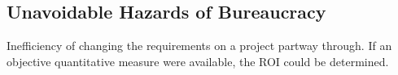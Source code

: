 \subsection{Unavoidable Hazards of Bureaucracy\label{sec:unavoidable_hazards}}

Inefficiency of changing the requirements on a project partway through. If an objective quantitative measure were available, the ROI could be determined. 